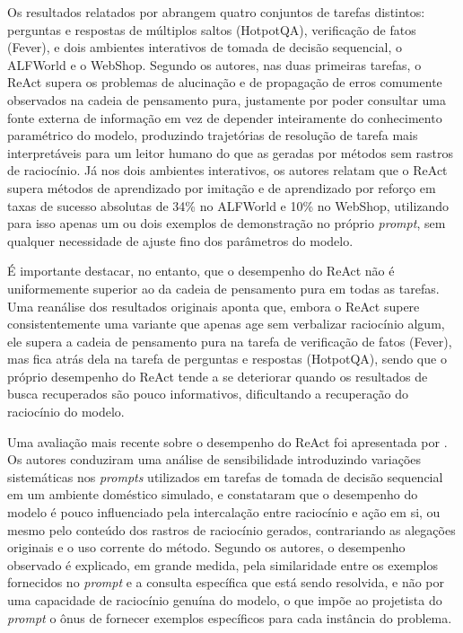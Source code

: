 Os resultados relatados por \citet{yao2023react} abrangem quatro conjuntos de tarefas distintos: perguntas e respostas de múltiplos saltos (HotpotQA), verificação de fatos (Fever), e dois ambientes interativos de tomada de decisão sequencial, o ALFWorld e o WebShop. Segundo os autores, nas duas primeiras tarefas, o ReAct supera os problemas de alucinação e de propagação de erros comumente observados na cadeia de pensamento pura, justamente por poder consultar uma fonte externa de informação em vez de depender inteiramente do conhecimento paramétrico do modelo, produzindo trajetórias de resolução de tarefa mais interpretáveis para um leitor humano do que as geradas por métodos sem rastros de raciocínio. Já nos dois ambientes interativos, os autores relatam que o ReAct supera métodos de aprendizado por imitação e de aprendizado por reforço em taxas de sucesso absolutas de 34\% no ALFWorld e 10\% no WebShop, utilizando para isso apenas um ou dois exemplos de demonstração no próprio \textit{prompt}, sem qualquer necessidade de ajuste fino dos parâmetros do modelo.

É importante destacar, no entanto, que o desempenho do ReAct não é uniformemente superior ao da cadeia de pensamento pura em todas as tarefas. Uma reanálise dos resultados originais aponta que, embora o ReAct supere consistentemente uma variante que apenas age sem verbalizar raciocínio algum, ele supera a cadeia de pensamento pura na tarefa de verificação de fatos (Fever), mas fica atrás dela na tarefa de perguntas e respostas (HotpotQA), sendo que o próprio desempenho do ReAct tende a se deteriorar quando os resultados de busca recuperados são pouco informativos, dificultando a recuperação do raciocínio do modelo.

Uma avaliação mais recente sobre o desempenho do ReAct foi apresentada por \citet{verma2024brittle}. Os autores conduziram uma análise de sensibilidade introduzindo variações sistemáticas nos \textit{prompts} utilizados em tarefas de tomada de decisão sequencial em um ambiente doméstico simulado, e constataram que o desempenho do modelo é pouco influenciado pela intercalação entre raciocínio e ação em si, ou mesmo pelo conteúdo dos rastros de raciocínio gerados, contrariando as alegações originais e o uso corrente do método. Segundo os autores, o desempenho observado é explicado, em grande medida, pela similaridade entre os exemplos fornecidos no \textit{prompt} e a consulta específica que está sendo resolvida, e não por uma capacidade de raciocínio genuína do modelo, o que impõe ao projetista do \textit{prompt} o ônus de fornecer exemplos específicos para cada instância do problema.

